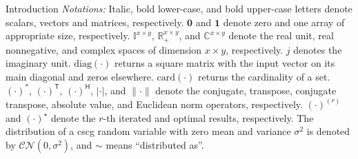 \documentclass[journal,12pt,onecolumn,draftclsnofoot]{IEEEtran}
\theoremstyle{remark}
\begin{document}
\begin{section}{Introduction}
	\emph{Notations:}
	Italic, bold lower-case, and bold upper-case letters denote scalars, vectors and matrices, respectively.
	$\boldsymbol{0}$ and $\boldsymbol{1}$ denote zero and one array of appropriate size, respectively. $\mathbb{I}^{x \times y}$, $\mathbb{R}_+^{x \times y}$, and $\mathbb{C}^{x \times y}$ denote the real unit, real nonnegative, and complex spaces of dimension $x \times y$, respectively.
	$j$ denotes the imaginary unit.
	$\mathrm{diag}(\cdot)$ returns a square matrix with the input vector on its main diagonal and zeros elsewhere.
	$\mathrm{card}(\cdot)$ returns the cardinality of a set.
	$(\cdot)^*$, $(\cdot)^\mathsf{T}$, $(\cdot)^\mathsf{H}$, $\lvert{\cdot}\rvert$, and $\lVert{\cdot}\rVert$ denote the conjugate, transpose, conjugate transpose, absolute value, and Euclidean norm operators, respectively.
	$(\cdot)^{(r)}$ and $(\cdot)^{\star}$ denote the $r$-th iterated and optimal results, respectively.
	The distribution of a \gls{cscg} random variable with zero mean and variance $\sigma^2$ is denoted by $\mathcal{CN}(0,\sigma^2)$, and $\sim$ means ``distributed as''.
\end{section}
\end{document}
